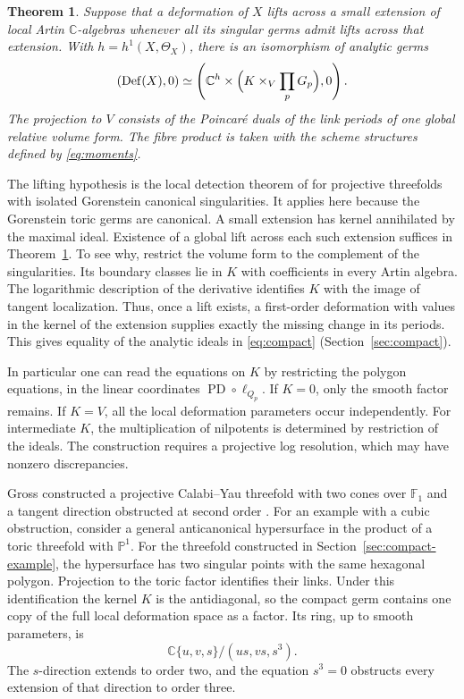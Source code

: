 \documentclass[11pt]{amsart}
\newtheorem{theorem}{Theorem}[section]
\theoremstyle{definition}
\theoremstyle{remark}
\newcommand{\C}{\mathbb C}
\DeclareMathOperator{\Def}{Def}
\DeclareMathOperator{\PD}{PD}
\begin{document}
\begin{samepage}
\begin{theorem}\label{thm:global}
Suppose that a deformation of $X$ lifts across a small extension of
local Artin $\C$-algebras whenever all its singular germs admit lifts
across that extension. With $h=h^1(X,\Theta_X)$, there is an
isomorphism of analytic germs
\begin{equation}\label{eq:compact}
 (\Def(X),0)\simeq
 \left(\C^h\times\Bigl(K\times_V\prod_p G_p\Bigr),0\right).
\end{equation}
The projection to $V$ consists of the Poincar\'e duals of the link
periods of one global relative volume form. The fibre product is taken
with the scheme structures defined by \eqref{eq:moments}.
\end{theorem}
\end{samepage}

The lifting hypothesis is the local detection theorem of
\cite[Lemma~3.1]{Wue} for projective threefolds with isolated
Gorenstein canonical singularities. It applies here because the
Gorenstein toric germs are canonical. A small extension has kernel
annihilated by the maximal ideal. Existence of a global lift across
each such extension suffices in Theorem~\ref{thm:global}.
To see why, restrict the volume form to the complement of the
singularities. Its boundary classes lie in $K$ with coefficients in
every Artin algebra. The logarithmic description of the derivative
identifies $K$ with the image of tangent localization. Thus, once a
lift exists, a first-order deformation with values in the kernel of
the extension supplies exactly the missing change in its periods.
This gives equality of the analytic ideals in \eqref{eq:compact}
(Section~\ref{sec:compact}).

In particular one can read the equations on $K$ by restricting the
polygon equations, in the linear coordinates $\PD\circ\ell_{Q_p}$.
If $K=0$, only the smooth factor remains. If $K=V$, all the local
deformation parameters occur independently. For intermediate $K$,
the multiplication of nilpotents is determined by restriction of the
ideals. The construction requires a projective log resolution, which
may have nonzero discrepancies.

Gross constructed a projective Calabi--Yau threefold with two cones over
$\mathbb F_1$ and a tangent direction obstructed at second order
\cite[Example~2.19]{Gross}. For an example with a cubic obstruction,
consider a general anticanonical hypersurface in the product of a
toric threefold with $\mathbb P^1$. For the threefold constructed in
Section~\ref{sec:compact-example}, the hypersurface has two singular
points with the same hexagonal polygon. Projection to the toric factor
identifies their links. Under this identification the kernel $K$ is
the antidiagonal, so the compact germ contains one copy of the full
local deformation space as a factor. Its ring, up to smooth parameters, is
\[
 \C\{u,v,s\}/(us,vs,s^3).
\]
The $s$-direction extends to order two, and the equation $s^3=0$
obstructs every extension of that direction to order three.
\end{document}
